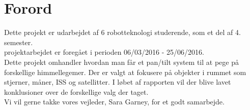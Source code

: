 \section*{Forord}

Dette projekt er udarbejdet af 6 robotteknologi studerende, som et del af 4. semester.\\ projektarbejdet er foregået i perioden 06/03/2016 - 25/06/2016. 
\\
Dette projekt omhandler hvordan man får et pan/tilt system til at pege på forskellige himmellegemer. Der er valgt at fokusere på objekter i rummet som stjerner, måner, ISS og satellitter. I løbet af rapporten vil der blive lavet konklusioner over de forskellige valg der taget.
\\
Vi vil gerne takke vores vejleder, Sara Garney, for et godt samarbejde.